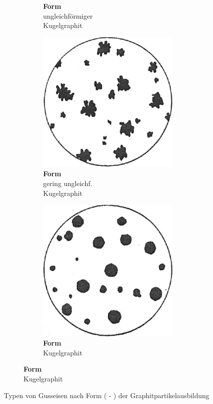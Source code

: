 \documentclass[
fontsize=10pt, 
listof = totoc,
parskip = half	
]{report}
\newcommand{\uproman}[1]{\uppercase\expandafter{\romannumeral#1}}
\begin{document}
\begin{figure}[h]
\begin{subfigure}{1.0\linewidth}
\begin{subfigure}[t]{0.33\textwidth}
			\caption*{\textbf{Form \uproman{4}}\\ungleichförmiger\\Kugelgraphit}
		\end{subfigure}
		\begin{subfigure}[t]{0.33\textwidth}
			\centering
			\includegraphics[scale=0.25]{pics/graphit_form5}
			\caption*{\textbf{Form \uproman{5}}\\gering ungleichf.\\Kugelgraphit }
		\end{subfigure}
		\begin{subfigure}[t]{0.33\textwidth}
			\centering
			\includegraphics[scale=0.25]{pics/graphit_form6}
			\caption*{\textbf{Form \uproman{6}}\\Kugelgraphit}
		\end{subfigure}
	\end{subfigure}
	\caption{Typen von Gusseisen nach Form (\uproman{1} - \uproman{6}) der Graphitpartikelausbildung \cite[S.7]{ISO945}}
	\label{fig:GraphitTypes}
\end{figure}
\end{document}
